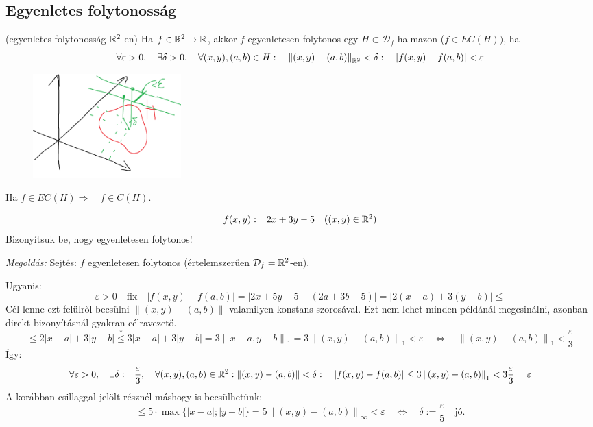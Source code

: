 \documentclass[a4paper,11.5pt]{article}
\newcommand{\norm}[1]{\left\lVert#1\right\rVert}
\begin{document}
	\subsection{Egyenletes folytonosság}
	\begin{revision}
		(egyenletes folytonosság $\mathbb{R}^2$-en) Ha $f\in\mathbb{R}^2\to\mathbb{R}$, akkor $f$ egyenletesen folytonos egy $H\subset \mathcal{D}_f$ halmazon ($f\in EC(H))$, ha
		\[ \forall\varepsilon>0,\quad \exists\delta>0,\quad \forall(x,y),(a,b)\in H:\quad \norm{(x,y)-(a,b)}_{\R^2}<\delta:\quad |f(x,y)-f(a,b)|<\varepsilon \]
		\begin{figure}[H]
			\centering
			\includegraphics[height=4cm]{../2zh/kepek/52.png}
			\caption{}
		\end{figure}
	\end{revision}
	\begin{revision}
		Ha $f\in EC(H)\Rightarrow\quad f\in C(H)$.
	\end{revision}
	\begin{task}
		\[ f(x,y):=2x+3y-5\quad ((x,y)\in\mathbb{R}^2) \]
		Bizonyítsuk be, hogy egyenletesen folytonos!
		
		\smallskip
		\textit{Megoldás:} Sejtés: $f$ egyenletesen folytonos (értelemszerűen $\mathcal{D}_f=\mathbb{R}^2$-en).
		
		Ugyanis:
		\[ \varepsilon>0\quad \text{fix}\quad |f(x,y)-f(a,b)|=|2x+5y-5-(2a+3b-5)|=|2(x-a)+3(y-b)|\leq \]
		Cél lenne ezt felülről becsülni $\norm{(x,y)-(a,b)}$ valamilyen konstans szorosával. Ezt nem lehet minden példánál megcsinálni, azonban direkt bizonyításnál gyakran célravezető.
		\[ \leq2|x-a|+3|y-b|\overset{*}{\leq} 3|x-a|+3|y-b|=3\norm{x-a,y-b}_1=3\norm{(x,y)-(a,b)}_1<\varepsilon\quad \Leftrightarrow\quad \norm{(x,y)-(a,b)}_1<\frac{\varepsilon}{3}  \]
		Így:
		\[ \forall\varepsilon>0,\quad \exists\delta:=\frac{\varepsilon}{3},\quad \forall(x,y),(a,b)\in\R^2 : \norm{(x,y)-(a,b)}<\delta:\quad |f(x,y)-f(a,b)|\leq 3\norm{(x,y)-(a,b)}_1<3\frac{\varepsilon}{3}=\varepsilon  \]
		A korábban csillaggal jelölt résznél máshogy is becsülhetünk:
		\[ \leq 5\cdot\max\{ |x-a|;|y-b|\}=5\norm{(x,y)-(a,b)}_\infty<\varepsilon\quad \Leftrightarrow\quad \delta:=\frac{\varepsilon}{5}\quad \text{jó.} \]
		
	\end{task}
\end{document}
